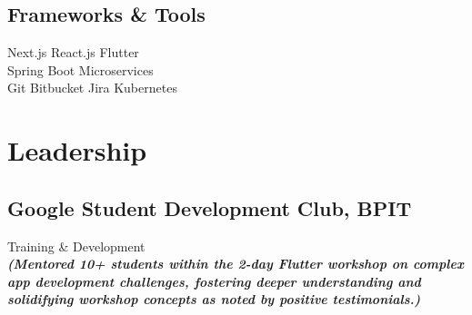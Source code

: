 \documentclass[]{deedy-resume-reversed}
\begin{document}
\begin{minipage}[t]{0.38\textwidth}
\subsection{Frameworks \& Tools}
Next.js \textbullet{} React.js \textbullet{} Flutter \\
Spring Boot \textbullet{} Microservices \\
Git \textbullet{} Bitbucket \textbullet{} Jira \textbullet{} Kubernetes \\
\sectionsep


\section{Leadership}
\subsection{Google Student Development Club, BPIT}
Training \& Development \\
{\footnotesize \textit{\textbf{(Mentored 10+ students within the 2-day Flutter workshop on complex app development challenges, fostering deeper understanding and solidifying workshop concepts as noted by positive testimonials.) }}} \\
\sectionsep



\end{minipage}
\end{document}
